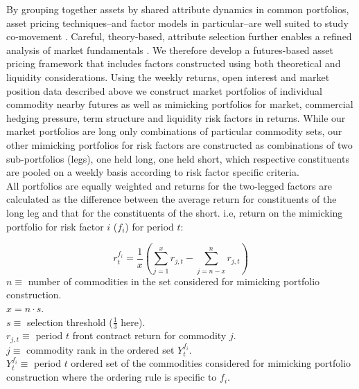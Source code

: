 \documentclass[
  authoryear,
  preprint,
  3p]{elsarticle}
\begin{document}
By grouping together assets by shared attribute dynamics in common
portfolios, asset pricing techniques--and factor models in
particular--are well suited to study co-movement
\citep{fama_common_1993, carhart_persistence_1997, asness_devil_2013, fama_five_factor_2015, hou_digesting_2015, asness_fact_2015, frazzini_betting_2014, asness_quality_2019}.
Careful, theory-based, attribute selection further enables a refined
analysis of market fundamentals
\citep{schwartz_short_2000, miffre_momentum_2007, gorton_fundamentals_2012, cortazar_commodity_2013, yang_investment_2013, daskalaki_factors_2014, szymanowska_anatomy_2014, fernandez_skewness_2018, bakshi_understanding_2019, boons_basis_2019, sakkas_factor_2020}.
We therefore develop a futures-based asset pricing framework that
includes factors constructed using both theoretical and liquidity
considerations. Using the weekly returns, open interest and market
position data described above we construct market portfolios of
individual commodity nearby futures as well as mimicking portfolios for
market, commercial hedging pressure, term structure and liquidity risk
factors in returns. While our market portfolios are long only
combinations of particular commodity sets, our other mimicking
portfolios for risk factors are constructed as combinations of two
sub-portfolios (legs), one held long, one held short, which respective
constituents are pooled on a weekly basis according to risk factor
specific criteria.\\
All portfolios are equally weighted and returns for the two-legged
factors are calculated as the difference between the average return for
constituents of the long leg and that for the constituents of the short.
i.e, return on the mimicking portfolio for risk factor \(i\) (\(f_{i}\))
for period \(t\):

\[r_{t}^{f_{i}} = \frac{1}{x} \left ( \sum_{j=1}^{x}r_{j,t} - \sum_{j=n-x}^{n} r_{j,t} \right )\]
\(n\equiv\) number of commodities in the set considered for mimicking
portfolio construction.\\
\(x = n \cdot s\).\\
\(s\equiv\) selection threshold (\(\frac{1}{3}\) here).\\
\(r_{j,t}\equiv\) period \(t\) front contract return for commodity
\(j\).\\
\(j\equiv\) commodity rank in the ordered set \(Y_{t}^{f_{i}}\).\\
\(Y_{t}^{f_{i}}\equiv\) period \(t\) ordered set of the commodities
considered for mimicking portfolio construction where the ordering rule
is specific to \(f_{i}\).
\end{document}
